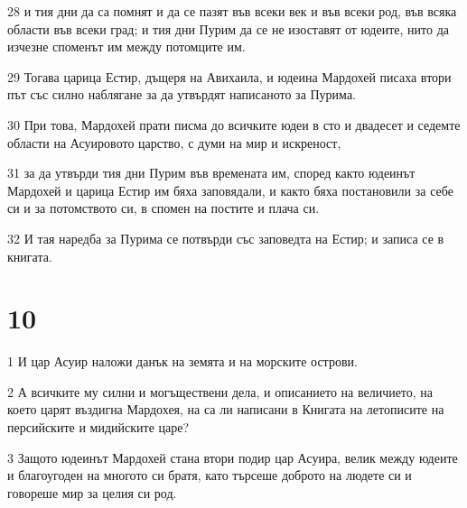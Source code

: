 \par 28 и тия дни да са помнят и да се пазят във всеки век и във всеки род, във всяка области във всеки град; и тия дни Пурим да се не изоставят от юдеите, нито да изчезне споменът им между потомците им.
\par 29 Тогава царица Естир, дъщеря на Авихаила, и юдеина Мардохей писаха втори път със силно наблягане за да утвърдят написаното за Пурима.
\par 30 При това, Мардохей прати писма до всичките юдеи в сто и двадесет и седемте области на Асуировото царство, с думи на мир и искреност,
\par 31 за да утвърди тия дни Пурим във времената им, според както юдеинът Мардохей и царица Естир им бяха заповядали, и както бяха постановили за себе си и за потомството си, в спомен на постите и плача си.
\par 32 И тая наредба за Пурима се потвърди със заповедта на Естир; и записа се в книгата.

\chapter{10}

\par 1 И цар Асуир наложи данък на земята и на морските острови.
\par 2 А всичките му силни и могъществени дела, и описанието на величието, на което царят въздигна Мардохея, на са ли написани в Книгата на летописите на персийските и мидийските царе?
\par 3 Защото юдеинът Мардохей стана втори подир цар Асуира, велик между юдеите и благоугоден на многото си братя, като търсеше доброто на людете си и говореше мир за целия си род.

